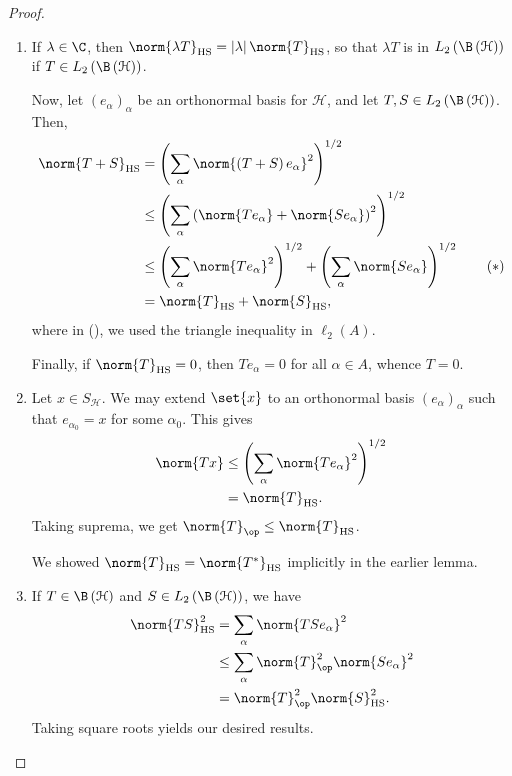 \documentclass[10pt]{mypackage}
\DeclareMathOperator{\hs}{HS}
\begin{document}
\begin{proof}\hfill
  \begin{enumerate}[(1)]
    \item If $\lambda\in \C$, then $\norm{\lambda T}_{\hs} = \left\vert \lambda \right\vert\norm{T}_{\hs}$, so that $\lambda T$ is in $L_2\left( \B\left( \mathcal{H} \right) \right)$ if $T\in L_2\left( \B\left( \mathcal{H} \right) \right)$.\newline

      Now, let $\left( e_{\alpha} \right)_{\alpha}$ be an orthonormal basis for $\mathcal{H}$, and let $T,S\in L_2\left( \B\left( \mathcal{H} \right) \right)$. Then,
      \begin{align*}
        \norm{T + S}_{\hs} &= \left( \sum_{\alpha} \norm{\left( T + S \right)e_{\alpha}}^2 \right)^{1/2}\\
                           &\leq \left( \sum_{\alpha}\left( \norm{Te_{\alpha}} + \norm{Se_{\alpha}} \right)^2 \right)^{1/2}\\
                           &\leq \left( \sum_{\alpha}\norm{Te_{\alpha}}^2 \right)^{1/2} + \left( \sum_{\alpha}\norm{Se_{\alpha}} \right)^{1/2}\tag{\textasteriskcentered}\\
                           &= \norm{T}_{\hs} + \norm{S}_{\hs},
      \end{align*}
      where in (\textasteriskcentered), we used the triangle inequality in $\ell_2\left( A \right)$.\newline

      Finally, if $\norm{T}_{\hs} = 0$, then $Te_{\alpha} = 0$ for all $\alpha \in A$, whence $T = 0$.
    \item Let $x\in S_{\mathcal{H}}$. We may extend $\set{x}$ to an orthonormal basis $\left( e_{\alpha} \right)_{\alpha}$ such that $e_{\alpha_0} = x$ for some $\alpha_0$. This gives
      \begin{align*}
        \norm{Tx} &\leq \left( \sum_{\alpha}\norm{Te_{\alpha}}^2 \right)^{1/2}\\
                  &= \norm{T}_{\hs}.
      \end{align*}
      Taking suprema, we get $\norm{T}_{\op}\leq \norm{T}_{\hs}$.\newline

      We showed $\norm{T}_{\hs} = \norm{T^{\ast}}_{\hs}$ implicitly in the earlier lemma.
    \item If $T\in \B\left( \mathcal{H} \right)$ and $S\in L_2\left( \B\left( \mathcal{H} \right) \right)$, we have
      \begin{align*}
        \norm{TS}_{\hs}^2 &= \sum_{\alpha}\norm{TSe_{\alpha}}^2\\
                          &\leq \sum_{\alpha}\norm{T}_{\op}^2\norm{Se_{\alpha}}^2\\
                          &= \norm{T}_{\op}^2 \norm{S}_{\hs}^2.
      \end{align*}
      Taking square roots yields our desired results.\newline


\end{enumerate}
\end{proof}
\end{document}
